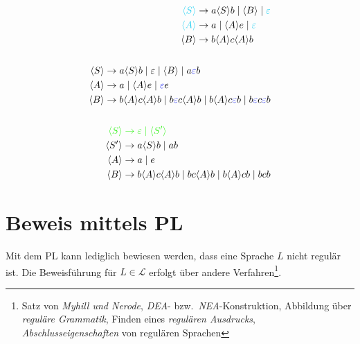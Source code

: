 \documentclass[a4paper,parskip=half,footsepline=on,headings=normal,titlepage=false]{scrartcl}
\newcommand{\nt}[1]{\langle \uppercase{#1} \rangle}
\renewcommand{\epsilon}{\varepsilon}
\begin{document}
\begin{subequations}
\begin{align}
    \label{eq:epsilon:1_search}
    \begin{split}
    \color{c1}\nt{S} & \to a \nt{S} b \mid \nt{B} \mid \color{c1}\epsilon \\
    \color{c1}\nt{A} & \to a \mid \nt{A}e \mid \color{c1}\epsilon \\
    \nt{B} & \to b\nt{A}c\nt{A}b
    \end{split}
    \\ \nonumber \\
    \label{eq:epsilon:2_elemination}
    \begin{split}
    \nt{S} & \to a \nt{S} b \mid \epsilon \mid \nt{B} \mid a{\color{c2}\epsilon}b \\
    \nt{A} & \to a \mid \nt{A}e \mid {\color{c2}\epsilon}e \\
    \nt{B} & \to b\nt{A}c\nt{A}b \mid b{\color{c2}\epsilon}c\nt{A}b \mid b\nt{A}c{\color{c2}\epsilon}b \mid b{\color{c2}\epsilon}c{\color{c2}\epsilon}b
    \end{split}
    \\ \nonumber \\
    \label{eq:epsilon:3_isolation}
    \begin{split}
    \color{c3}\nt{S} & \color{c3}\to \epsilon \mid \nt{S'} \\
    \nt{S'} & \to a \nt{S} b \mid ab \\
    \nt{A} & \to a \mid e \\
    \nt{B} & \to b\nt{A}c\nt{A}b \mid bc\nt{A}b \mid b\nt{A}cb \mid bcb
    \end{split}
\end{align}
\end{subequations}

\section{Beweis mittels \acl{PL}}
Mit dem \ac{PL} kann lediglich bewiesen werden, dass eine Sprache $L$ nicht regulär ist.
Die Beweisführung für $L \in \mathcal{L}$ erfolgt über andere Verfahren\footnote{Satz von \emph{Myhill und Nerode}, \emph{\acs{DEA}}- bzw.\ \emph{\acs{NEA}}-Konstruktion, Abbildung über \emph{reguläre Grammatik}, Finden eines \emph{regulären Ausdrucks}, \emph{Abschlusseigenschaften} von regulären Sprachen}.
\end{document}

